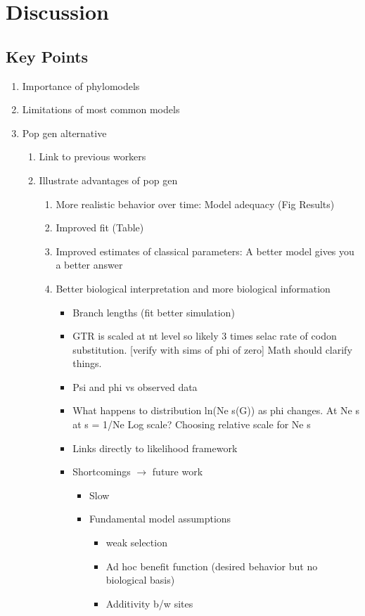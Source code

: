 \documentclass{article}
\begin{document}
\section*{Discussion}
\subsection*{Key Points}
\begin{enumerate}
\item Importance of phylomodels
\item Limitations of most  common models
\item Pop gen alternative
  \begin{enumerate}
  \item Link to previous workers
  \item Illustrate advantages of pop gen
    \begin{enumerate}
    \item More realistic behavior over time: Model adequacy (Fig Results)
    \item Improved fit (Table)
    \item Improved estimates of classical parameters: A better model gives you a better answer
    \item Better biological interpretation and more biological information
\begin{itemize}
\item Branch lengths (fit better simulation)
   \item GTR is scaled at nt level so likely 3 times selac rate of codon substitution. [verify with sims of phi of zero]
Math should clarify things.
\item Psi and phi vs observed data
\item What happens to distribution ln(Ne s(G))  as phi changes.
At Ne s at s = 1/Ne
Log scale?  Choosing relative scale for Ne s  
    \item Links directly to likelihood framework
    \item Shortcomings $\rightarrow$ future work
      \begin{itemize}
      \item Slow
      \item Fundamental model assumptions
        \begin{itemize}
        \item weak selection
        \item Ad hoc benefit function (desired behavior but no biological basis)
        \item Additivity b/w sites

\end{itemize}
\end{itemize}
\end{itemize}
\end{enumerate}
\end{enumerate}
\end{enumerate}
\end{document}
